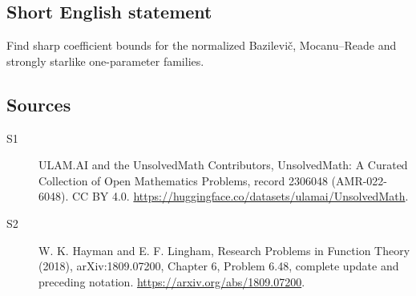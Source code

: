 \documentclass[11pt]{article}
\begin{document}
\subsection{Short English statement}
Find sharp coefficient bounds for the normalized Bazilevič, Mocanu–Reade and strongly starlike one-parameter families.
\subsection{Sources}
\begin{description}
\item[\hypertarget{source:2306048:1}{S1}] ULAM.AI and the UnsolvedMath Contributors, UnsolvedMath: A Curated Collection of Open Mathematics Problems, record 2306048 (AMR-022-6048). CC BY 4.0. \url{https://huggingface.co/datasets/ulamai/UnsolvedMath}.
\item[\hypertarget{source:2306048:2}{S2}] W. K. Hayman and E. F. Lingham, Research Problems in Function Theory (2018), arXiv:1809.07200, Chapter 6, Problem 6.48, complete update and preceding notation. \url{https://arxiv.org/abs/1809.07200}.
\end{description}
\label{end:2306048}
\end{document}
